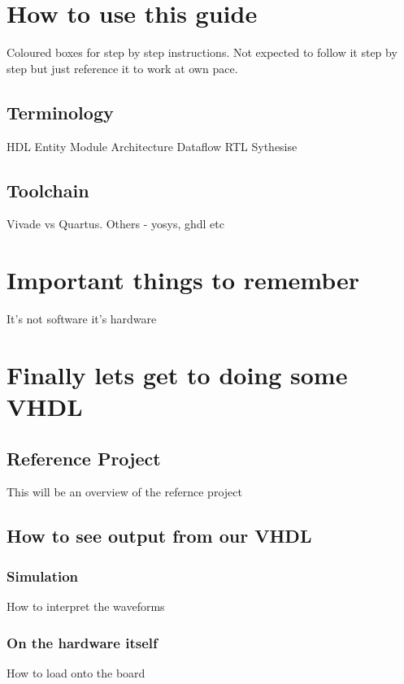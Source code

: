 \documentclass[12pt,a4paper]{article}
\begin{document}
\section{How to use this guide}
Coloured boxes for step by step instructions. Not expected to follow it step by step but just reference it to work at own pace.

\subsection{Terminology}
HDL
Entity
Module
Architecture
Dataflow
RTL
Sythesise

\subsection{Toolchain}
Vivade vs Quartus. Others - yosys, ghdl etc
\section{Important things to remember}
It's not software it's hardware
\section{Finally lets get to doing some VHDL}

\subsection{Reference Project}
This will be an overview of the refernce project
\subsection{How to see output from our VHDL}
\subsubsection{Simulation}
How to interpret the waveforms
\subsubsection{On the hardware itself}
How to load onto the board
\end{document}
